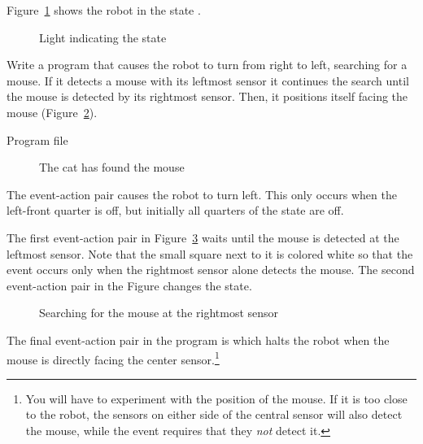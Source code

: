 Figure~\ref{fig.state-leds} shows the robot in the state .


\begin{figure}
\begin{center}
\caption{Light indicating the state}\label{fig.state-leds}
\end{center}
\end{figure}


Write a program that causes the robot to turn from right to left,
searching for a mouse. If it detects a mouse with its leftmost sensor it
continues the search until the mouse is detected by its rightmost
sensor. Then, it positions itself facing the mouse
(Figure~\ref{fig.cat-mouse}).

{\raggedleft \hfill Program file }


\begin{figure}
\begin{center}
\caption{The cat has found the mouse}\label{fig.cat-mouse}
\end{center}
\end{figure}

The event-action pair  causes the robot to turn left. This
only occurs when the left-front quarter is off, but initially all
quarters of the state are off.

The first event-action pair in Figure~\ref{fig.mouse2} waits until the
mouse is detected at the leftmost sensor. Note that the small square
next to it is colored white so that the event occurs only when the
rightmost sensor alone detects the mouse. The second event-action pair
in the Figure changes the state.

\begin{figure}
\begin{center}
\caption{Searching for the mouse at the rightmost sensor}\label{fig.mouse2}
\end{center}
\end{figure}

The final event-action pair in the program is  which halts
the robot when the mouse is directly facing the center
sensor.\footnote{You will have to experiment with the position of the
mouse. If it is too close to the robot, the sensors on either side of
the central sensor will also detect the mouse, while the event requires
that they \emph{not} detect it.}

